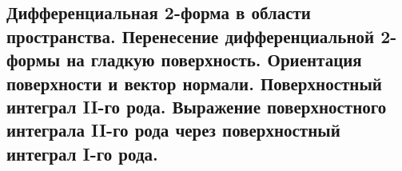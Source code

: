 \subsection{Дифференциальная 2-форма в области пространства. Перенесение дифференциальной 2-формы на гладкую поверхность. Ориентация поверхности и вектор нормали. Поверхностный интеграл II-го рода. Выражение поверхностного интеграла II-го рода через поверхностный интеграл I-го рода.}
